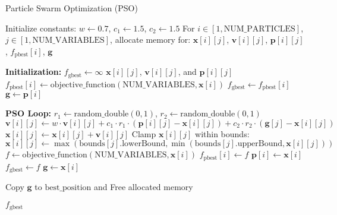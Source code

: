 \documentclass[12pt]{article}
\begin{document}
	\begin{algorithm}[h!]
		\caption{Particle Swarm Optimization (PSO)}
		\begin{algorithmic}[1]
			\State Initialize constants: $w \gets 0.7$, $c_1 \gets 1.5$, $c_2 \gets 1.5$ 
			\State For $i \in [1, \text{NUM\_PARTICLES}]$, $j \in [1, \text{NUM\_VARIABLES}]$, allocate memory for:
			\State \hspace{\algorithmicindent} $\mathbf{x}[i][j]$, $\mathbf{v}[i][j]$, $\mathbf{p}[i][j]$, $f_\text{pbest}[i]$, $\mathbf{g}$
			
			\State \textbf{Initialization:}
			$f_\text{gbest} \gets \infty$
			\State $\mathbf{x}[i][j]$, $\mathbf{v}[i][j]$, and $\mathbf{p}[i][j]$
			\EndFor
			\State $f_\text{pbest}[i] \gets \text{objective\_function}(\text{NUM\_VARIABLES}, \mathbf{x}[i])$
			\State $f_\text{gbest} \gets f_\text{pbest}[i]$
			\State $\mathbf{g} \gets \mathbf{p}[i]$
			\EndIf
			\EndFor
			
			\State \textbf{PSO Loop:}
			\State $r_1 \gets \text{random\_double}(0, 1)$, $r_2 \gets \text{random\_double}(0, 1)$
			\State $\mathbf{v}[i][j] \gets w \cdot \mathbf{v}[i][j] + c_1 \cdot r_1 \cdot (\mathbf{p}[i][j] - \mathbf{x}[i][j]) + c_2 \cdot r_2 \cdot (\mathbf{g}[j] - \mathbf{x}[i][j])$
			\State $\mathbf{x}[i][j] \gets \mathbf{x}[i][j] + \mathbf{v}[i][j]$
			\State Clamp $\mathbf{x}[i][j]$ within bounds: 
			\State \hspace{\algorithmicindent} $\mathbf{x}[i][j] \gets \max(\text{bounds}[j].\text{lowerBound}, \min(\text{bounds}[j].\text{upperBound}, \mathbf{x}[i][j]))$
			\EndFor
			\State $f \gets \text{objective\_function}(\text{NUM\_VARIABLES}, \mathbf{x}[i])$
			\State $f_\text{pbest}[i] \gets f$
			\State $\mathbf{p}[i] \gets \mathbf{x}[i]$
			\EndIf
			\State $f_\text{gbest} \gets f$
			\State $\mathbf{g} \gets \mathbf{x}[i]$
			\EndIf
			\EndFor
			\EndFor
			
			\State Copy $\mathbf{g}$ to $\text{best\_position}$ and Free allocated memory

			\State \Return $f_\text{gbest}$
		\end{algorithmic}
	\end{algorithm}
	
	
	
\end{document}
